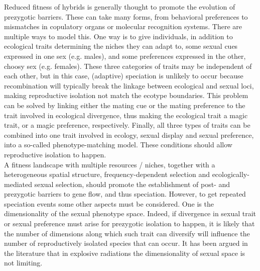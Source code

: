 \documentclass[]{article}
\begin{document}
Reduced fitness of hybrids is generally thought to promote the evolution of prezygotic barriers. These can take many forms, from behavioral preferences to mismatches in copulatory organs or molecular recognition systems. There are multiple ways to model this. One way is to give individuals, in addition to ecological traits determining the niches they can adapt to, some sexual cues expressed in one sex (e.g. males), and some preferences expressed in the other, choosy sex (e.g. females). These three categories of traits may be independent of each other, but in this case, (adaptive) speciation is unlikely to occur because recombination will typically break the linkage between ecological and sexual loci, making reproductive isolation not match the ecotype boundaries. This problem can be solved by linking either the mating cue or the mating preference to the trait involved in ecological divergence, thus making the ecological trait a magic trait, or a magic preference, respectively. Finally, all three types of traits can be combined into one trait involved in ecology, sexual display and sexual preference, into a so-called phenotype-matching model. These conditions should allow reproductive isolation to happen.\\

A fitness landscape with multiple resources / niches, together with a heterogeneous spatial structure, frequency-dependent selection and ecologically-mediated sexual selection, should promote the establishment of post- and prezygotic barriers to gene flow, and thus speciation. However, to get repeated speciation events some other aspects must be considered. One is the dimensionality of the sexual phenotype space. Indeed, if divergence in sexual trait or sexual preference must arise for prezygotic isolation to happen, it is likely that the number of dimensions along which such trait can diversify will influence the number of reproductively isolated species that can occur. It has been argued in the literature that in explosive radiations the dimensionality of sexual space is not limiting.\\
\end{document}
